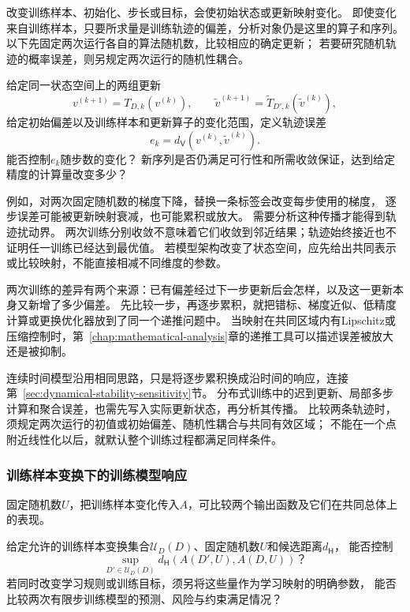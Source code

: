 改变训练样本、初始化、步长或目标，会使初始状态或更新映射变化。
即使变化来自训练样本，只要所求量是训练轨迹的偏差，分析对象仍是这里的算子和序列。
以下先固定两次运行各自的算法随机数，比较相应的确定更新；
若要研究随机轨迹的概率误差，则另规定两次运行的随机性耦合。

\begin{mathproblem}[训练轨迹对训练样本和学习规则的响应]
  \label{question:future-iteration-perturbation}
  给定同一状态空间上的两组更新
  \[
    v^{(k+1)}=T_{D,k}(v^{(k)}),\qquad
    \widetilde v^{(k+1)}=\widetilde T_{D',k}(\widetilde v^{(k)}),
  \]
  给定初始偏差以及训练样本和更新算子的变化范围，定义轨迹误差
  \[
    e_k=d_{\mathsf V}(v^{(k)},\widetilde v^{(k)}).
  \]
  能否控制$e_k$随步数的变化？
  新序列是否仍满足可行性和所需收敛保证，达到给定精度的计算量改变多少？
\end{mathproblem}

例如，对两次固定随机数的梯度下降，替换一条标签会改变每步使用的梯度，
逐步误差可能被更新映射衰减，也可能累积或放大。
需要分析这种传播才能得到轨迹扰动界。
两次训练分别收敛不意味着它们收敛到邻近结果；轨迹始终接近也不证明任一训练已经达到最优值。
若模型架构改变了状态空间，应先给出共同表示或比较映射，不能直接相减不同维度的参数。

两次训练的差异有两个来源：已有偏差经过下一步更新后会怎样，以及这一更新本身又新增了多少偏差。
先比较一步，再逐步累积，就把错标、梯度近似、低精度计算或更换优化器放到了同一个递推问题中。
当映射在共同区域内有Lipschitz或压缩控制时，第~\ref{chap:mathematical-analysis}章的递推工具可以描述误差被放大还是被抑制。

连续时间模型沿用相同思路，只是将逐步累积换成沿时间的响应，连接第~\ref{sec:dynamical-stability-sensitivity}节。
分布式训练中的迟到更新、局部多步计算和聚合误差，也需先写入实际更新状态，再分析其传播。
比较两条轨迹时，须规定两次运行的初值或初始偏差、随机性耦合与共同有效区域；
不能在一个点附近线性化以后，就默认整个训练过程都满足同样条件。

\subsubsection{训练样本变换下的训练模型响应}
\label{sec:future-analysis-perturbation-map}

固定随机数$U$，把训练样本变化传入$A$，可比较两个输出函数及它们在共同总体上的表现。

\begin{mathproblem}[训练样本变换造成的训练模型差异]
  \label{question:future-perturbation-map}
  给定允许的训练样本变换集合$\mathcal U_D(D)$、固定随机数$U$和候选距离$d_{\mathsf H}$，
  能否控制
  \[
    \sup_{D'\in\mathcal U_D(D)}
      d_{\mathsf H}(A(D',U),A(D,U))\text{？}
  \]
  若同时改变学习规则或训练目标，须另将这些量作为学习映射的明确参数，
  能否比较两次有限步训练模型的预测、风险与约束满足情况？
\end{mathproblem}

